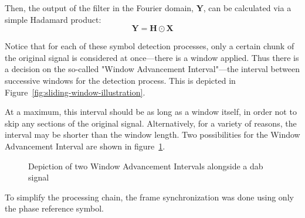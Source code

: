\documentclass[class=report,11pt,crop=false]{standalone}
\begin{document}
Then, the output of the filter in the Fourier domain, \(\mathbf{Y}\), can be calculated via a simple Hadamard product:
\begin{equation}
  \mathbf{Y} = \mathbf{H} \odot \mathbf{X}
\end{equation}

Notice that for each of these symbol detection processes, only a certain chunk of the original signal is considered at once---there is a window applied. Thus there is a decision on the so-called "Window Advancement Interval"---the interval between successive windows for the detection process. This is depicted in Figure~\ref{fig:sliding-window-illustration}.

At a maximum, this interval should be as long as a window itself, in order not to skip any sections of the original signal. Alternatively, for a variety of reasons, the interval may be shorter than the window length. Two possibilities for the Window Advancement Interval are shown in figure~\ref{fig:matched-filter-sliding-window-advance}.

\begin{figure}[htbp]
  \centering
  \captionsetup{type=figure}
  \def\svgwidth{\linewidth}
  { %
      }
      \caption{Depiction of two Window Advancement Intervals alongside a \gls{dab} signal}
      \label{fig:matched-filter-sliding-window-advance}
\end{figure}

To simplify the processing chain, the frame synchronization was done using only the phase reference symbol.

\end{document}
